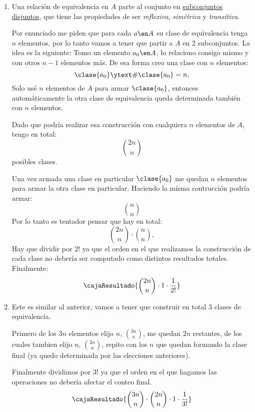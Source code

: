\begin{enumerate}[label=\alph*)]
  \item Una relación de equivalencia en $A$ parte al conjunto en \ul{subconjuntos disjuntos}, que tiene las propiedades de
        ser \textit{reflexiva}, \textit{simétrica} y \textit{transitiva}.

        Por enunciado me piden que para cada $a \en A$ su clase de equivalencia tenga $n$ elementos, por lo tanto vamos a tener que partir
        a $A$ en 2 subconjuntos.
        La idea es la siguiente: Tomo un elemento $a_0 \en A$, lo relaciono consigo mismo y con otros $n - 1$ elementos más.
        De esa forma creo una clase con $n$ elementos:
        $$
          \clase{a_0} \ytext \#\clase{a_0} = n,
        $$
        Solo usé $n$ elementos de $A$ para armar $\clase{a_0}$, entonces automáticamente la otra clase de equivalencia queda determinada también
        con $n$ elementos.

        Dado que podría realizar esa construcción con cualquiera $n$ elementos de $A$, tengo en total:
        $$
          \binom{2n}{n}
        $$
        posibles clases.

        Una vez armada una clase en particular $\clase{a_0}$ me quedan $n$ elementos para armar la otra clase en particular.
        Haciendo la misma contrucción podría armar:
        $$
          \binom{n}{n}
        $$
        Por lo tanto es tentador pensar que hay en total:
        $$
          \binom{2n}{n} \cdot \binom{n}{n},
        $$
         Hay que dividir por $2!$ ya que el orden
        en el que realizamos la construcción de cada clase no debería ser computado como distintos resultados totales.
        Finalmente:
        $$
          \cajaResultado{\binom{2n}{n} \cdot 1 \cdot \frac{1}{2!}}
        $$

  \item Este es similar al anterior, vamos a tener que construir en total $3$ clases de equivalencia.

        Primero de los $3n$ elementos elijo $n$, $\binom{3n}{n}$,
        me quedan $2n$ restantes, de los cuales tambien elijo $n$, $\binom{2n}{n}$,
        repito con los $n$ que quedan formando la clase final (ya quedo determinada por las elecciones anteriores).

        Finalmente dividimos por $3!$ ya que el orden en el que hagamos las operaciones no debería afectar el conteo final.
        $$
          \cajaResultado{\binom{3n}{n} \cdot \binom{2n}{n} \cdot 1 \cdot \frac{1}{3!}}
        $$
\end{enumerate}

\begin{aportes}
  \item {}
\end{aportes}
